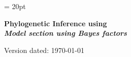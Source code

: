 \documentclass[11pt]{article}
\begin{document}
\renewcommand{\headrulewidth}{0.5pt}
\headsep = 20pt
\lhead{ }

\thispagestyle{plain}
\begin{center}

\textbf{\LARGE Phylogenetic Inference using \RevBayes}\\\vspace{2mm}
\textbf{\it{\Large Model section using Bayes factors}}\\\vspace{2mm}
\end{center}

\def \ResourcePath {./}
\def \GlobalResourcePath {../}


Version dated: \today
\end{document}
